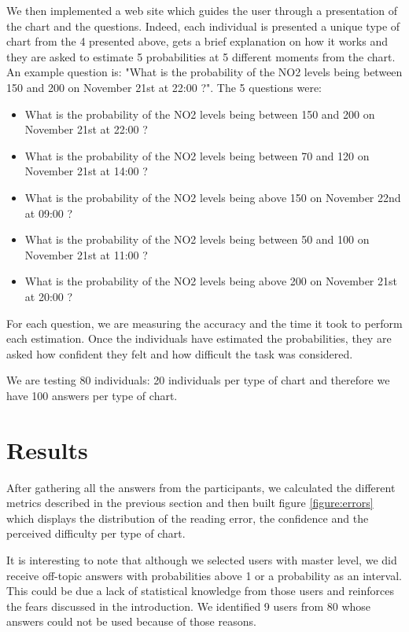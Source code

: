 \documentclass[a4paper,3p,sort&compress]{elsarticle}
\begin{document}
We then implemented a web site which guides the user through a presentation of the chart and the questions.
Indeed,  each individual is presented a unique type of chart from the 4 presented above, gets a brief 
explanation on how it works and they are asked to estimate 5 probabilities at 5 different moments from the chart. 
An example question is: 
"What is the probability of the NO2 levels being between 150 and 200 on 
November 21st at 22:00 ?". The 5 questions were:
\begin{itemize}
  \item What is the probability of the NO2 levels being between 150 and 200 on November 21st at 22:00 ?
  \item What is the probability of the NO2 levels being between 70 and 120 on November 21st at 14:00 ?
  \item What is the probability of the NO2 levels being above 150 on November 22nd at 09:00 ?
  \item What is the probability of the NO2 levels being between 50 and 100 on November 21st at 11:00 ?
  \item What is the probability of the NO2 levels being above 200 on November 21st at 20:00 ?
\end{itemize}

For each question, we are measuring the accuracy and the time it took to 
perform each estimation. Once the individuals have estimated the probabilities, they are asked how confident they 
felt and how difficult the task was considered.

We are testing 80 individuals: 20 individuals per type of chart and therefore we have 100 answers per 
type of chart.

\section{Results}
\label{sec:results}


After gathering all the answers from the participants, we calculated the different metrics described in the previous section and 
then built figure \ref{figure:errors} 
which displays 
the distribution of the reading error, the confidence and the perceived difficulty per type of chart. 

It is interesting to note that although we selected users with master level, we did receive off-topic answers with probabilities 
above 1 or a probability as an interval. This could be due a lack of statistical knowledge from those 
users and reinforces the fears discussed in the introduction. We identified 9 users from 80 whose answers could not be used because of those reasons.
\end{document}
